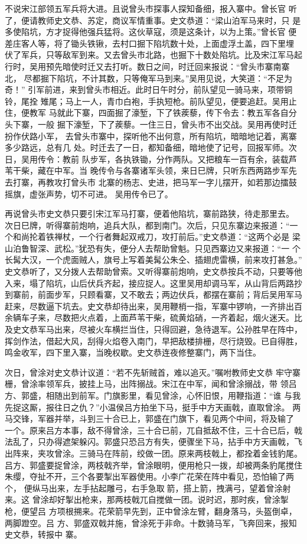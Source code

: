 不说宋江部领五军兵将大进。且说曾头市探事人探知备细，报入寨中。曾长官
听了，便请教师史文恭、苏定，商议军情重事。史文恭道：“梁山泊军马来时，只
是多使陷坑，方才捉得他强兵猛将。这伙草寇，须是这条计，以为上策。”曾长官
便差庄客人等，将了锄头铁锹，去村口掘下陷坑数十处，上面虚浮土盖，四下里埋
伏了军兵，只等敌军到来。又去曾头市北路，也掘下十数处陷坑。比及宋江军马起
行时，吴用预先暗使时迁又去打听。数日之间，时迁回来报说：“曾头市寨南寨北，
尽都掘下陷坑，不计其数，只等俺军马到来。”吴用见说，大笑道：“不足为奇！”
引军前进，来到曾头市相近。此时日午时分，前队望见一骑马来，项带铜铃，尾拴
雉尾；马上一人，青巾白袍，手执短枪。前队望见，便要追赶。吴用止住，便教军
马就此下寨，四面掘了濠堑，下了铁蒺藜，传下令去：教五军各自分头下寨，一般
掘下濠堑，下了蒺藜。一住三日，曾头市不出交战。吴用再使时迁扮作伏路小军，
去曾头市寨中，探听他不出何意，所有陷坑，暗暗地记着，离寨多少路远，总有几
处。时迁去了一日，都知备细，暗地使了记号，回报军师。次日，吴用传令：教前
队步军，各执铁锄，分作两队。又把粮车一百有余，装载芦苇干柴，藏在中军。当
晚传令与各寨诸军头领，来日巳牌，只听东西两路步军先去打寨，再教攻打曾头市
北寨的杨志、史进，把马军一字儿摆开，如若那边擂鼓摇旗，虚张声势，切不可进。
吴用传令已了。

再说曾头市史文恭只要引宋江军马打寨，便着他陷坑，寨前路狭，待走那里去。
次日巳牌，听得寨前炮响，追兵大队，都到南门。次后，只见东寨边来报道：“一
个和尚抡着铁禅杖，一个行者舞起双戒刀，攻打前后。”史文恭道：“这两个必是
梁山泊鲁智深、武松。”犹恐有失，便分人去帮助曾魁。只见西寨边又来报道：“一
个长髯大汉，一个虎面贼人，旗号上写着美髯公朱仝、插翅虎雷横，前来攻打甚急。”
史文恭听了，又分拨人去帮助曾索。又听得寨前炮响，史文恭按兵不动，只要等他
入来，塌了陷坑，山后伏兵齐起，接应捉人。这里吴用却调马军，从山背后两路抄
到寨前，前面步军，只顾看寨，又不敢去；两边伏兵，都摆在寨前；背后吴用军马
赶来，尽数逼下坑去。史文恭却待出来，吴用鞭梢一指，军寨中锣响，一齐排出百
余辆车子来，尽数把火点着，上面芦苇干柴，硫黄焰硝，一齐着起，烟火迷天。比
及史文恭军马出来，尽被火车横拦当住，只得回避，急待退军。公孙胜早在阵中，
挥剑作法，借起大风，刮得火焰卷入南门，早把敌楼排栅，尽行烧毁。已自得胜，
鸣金收军，四下里入寨，当晚权歇。史文恭连夜修整寨门，两下当住。

次日，曾涂对史文恭计议道：“若不先斩贼首，难以追灭。”嘱咐教师史文恭
牢守寨栅，曾涂率领军兵，披挂上马，出阵搦战。宋江在中军，闻和曾涂搦战，带
领吕方、郭盛，相随出到前军。门旗影里，看见曾涂，心怀旧恨，用鞭指道：“谁
与我先捉这厮，报往日之仇？”小温侯吕方拍坐下马，挺手中方天画戟，直取曾涂。
两马交锋，军器并举，斗到三十合已上，郭盛在门旗下，看见两个中间，将及输了
一个。原来吕方本事，敌不得曾涂，三十合已前，兀自抵敌不住，三十合已后，戟
法乱了，只办得遮架躲闪。郭盛只恐吕方有失，便骤坐下马，拈手中方天画戟，飞
出阵来，夹攻曾涂。三骑马在阵前，绞做一团。原来两枝戟上，都拴着金钱豹尾。
吕方、郭盛要捉曾涂，两枝戟齐举，曾涂眼明，便用枪只一拨，却被两条豹尾搅住
朱缨，夺扯不开，三个各要掣出军器使用。小李广花荣在阵中看见，恐怕输了两个，
便纵马出来，左手拈起雕弓，右手急取箭，搭上箭，拽满弓，望着曾涂射来。这
曾涂却好掣出枪来，那两枝戟兀自搅做一团。说时迟，那时疾，曾涂掣枪，便望吕
方项根搠来。花荣箭早先到，正中曾涂左臂，翻身落马，头盔倒卓，两脚蹬空。吕
方、郭盛双戟并施，曾涂死于非命。十数骑马军，飞奔回来，报知史文恭，转报中
寨。

